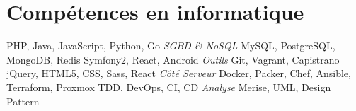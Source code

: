 \documentclass[11pt,a4paper]{moderncv}
\begin{document}
    \section{Compétences en informatique}
         {PHP, Java, JavaScript, Python, Go}
            {\textit{SGBD \& NoSQL}} {MySQL, PostgreSQL, MongoDB, Redis}
         {Symfony2, React, Android }
            {\textit{Outils}} {Git, Vagrant, Capistrano}
         {jQuery, HTML5, CSS, Sass, React}
            {\textit{Côté Serveur}} {Docker, Packer, Chef, Ansible, Terraform, Proxmox}
         {TDD, DevOps, CI, CD}
            {\textit{Analyse}} {Merise, UML, Design Pattern}
\end{document}
